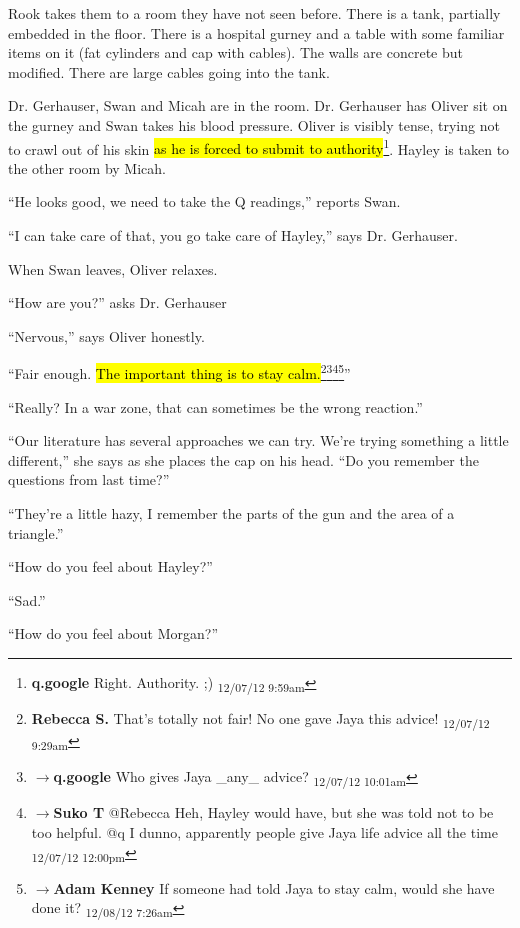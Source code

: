 Rook takes them to a room they have not seen before. There is a tank, partially embedded in the floor.  There is a hospital gurney and a table with some familiar items on it (fat cylinders and cap with cables).  The walls are concrete but modified.  There are large cables going into the tank.



Dr. Gerhauser, Swan and Micah are in the room.  Dr. Gerhauser has Oliver sit on the gurney and Swan takes his blood pressure.  Oliver is visibly tense, trying not to crawl out of his skin \hl{as he is forced to submit to authority}\footnote{\textbf{q.google }Right.  Authority.
;) \textsubscript{12/07/12 9:59am}}.  Hayley is taken to the other room by Micah. 



``He looks good, we need to take the Q readings,'' reports Swan.

``I can take care of that, you go take care of Hayley,'' says Dr. Gerhauser. 



When Swan leaves, Oliver relaxes.

``How are you?'' asks Dr. Gerhauser

``Nervous,'' says Oliver honestly.

``Fair enough.  \hl{The important thing is to stay calm.}\footnote{\textbf{Rebecca S. }That's totally not fair! No one gave Jaya this advice! \textsubscript{12/07/12 9:29am}}\footnote{$\rightarrow$\textbf{q.google }Who gives Jaya \_any\_ advice? \textsubscript{12/07/12 10:01am}}\footnote{$\rightarrow$\textbf{Suko T }@Rebecca Heh, Hayley would have, but she was told not to be too helpful. 
@q I dunno, apparently people give Jaya life advice all the time \textsubscript{12/07/12 12:00pm}}\footnote{$\rightarrow$\textbf{Adam Kenney }If someone had told Jaya to stay calm, would she have done it? \textsubscript{12/08/12 7:26am}}''

``Really?  In a war zone, that can sometimes be the wrong reaction.''

``Our literature has several approaches we can try.  We're trying something a little different,'' she says as she places the cap on his head. ``Do you remember the questions from last time?''

``They're a little hazy, I remember the parts of the gun and the area of a triangle.''

``How do you feel about Hayley?''

``Sad.''

``How do you feel about Morgan?''

